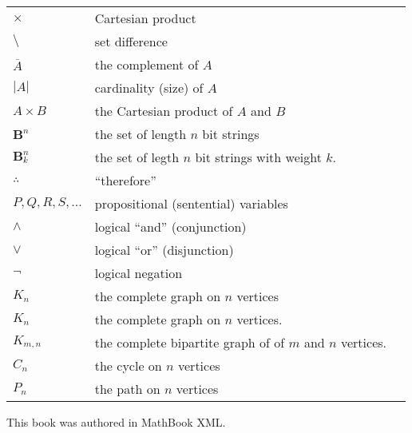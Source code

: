 \documentclass[10pt,]{book}
\theoremstyle{plain}
\theoremstyle{definition}
\theoremstyle{definition}
\theoremstyle{definition}
\theoremstyle{definition}
\numberwithin{equation}{chapter}
\newcommand{\B}{\mathbf B}
\renewcommand{\bar}{\overline}
\newcommand{\card}[1]{\left| #1 \right|}
\begin{document}
\begin{longtable}[l]{lp{}r}
\(\times\)&Cartesian product&\pageref{notation-21}\\
\(\setminus\)&set difference&\pageref{notation-22}\\
\(\bar{A}\)&the complement of \(A\)&\pageref{notation-23}\\
\(\card{A}\)&cardinality (size) of \(A\)&\pageref{notation-24}\\
\(A\times B\)&the Cartesian product of \(A\) and \(B\)&\pageref{notation-25}\\
\(\B^n\)&the set of length \(n\) bit strings&\pageref{notation-26}\\
\(\B^n_k\)&the set of legth \(n\) bit strings with weight \(k\).&\pageref{notation-27}\\
\(\therefore\)&``therefore''&\pageref{notation-28}\\
\(P, Q, R, S, \ldots\)&propositional (sentential) variables&\pageref{notation-29}\\
\(\wedge\)&logical ``and'' (conjunction)&\pageref{notation-30}\\
\(\vee\)&logical ``or'' (disjunction)&\pageref{notation-31}\\
\(\neg\)&logical negation&\pageref{notation-32}\\
\(K_n\)&the complete graph on \(n\) vertices&\pageref{notation-33}\\
\(K_n\)&the complete graph on \(n\) vertices.&\pageref{notation-34}\\
\(K_{m,n}\)&the complete bipartite graph of of \(m\) and \(n\) vertices.&\pageref{notation-35}\\
\(C_n\)&the cycle on \(n\) vertices&\pageref{notation-36}\\
\(P_n\)&the path on \(n\) vertices&\pageref{notation-37}\\
\end{longtable}
%
\backmatter
%
%
\renewcommand{\leftmark}{Index}
\printindex
%
\cleardoublepage
\pagestyle{empty}
\hypertarget{colophon-2}{}
\centerline{\hypertarget{p-1690}{}%
This book was authored in MathBook XML.%
}
\end{document}
